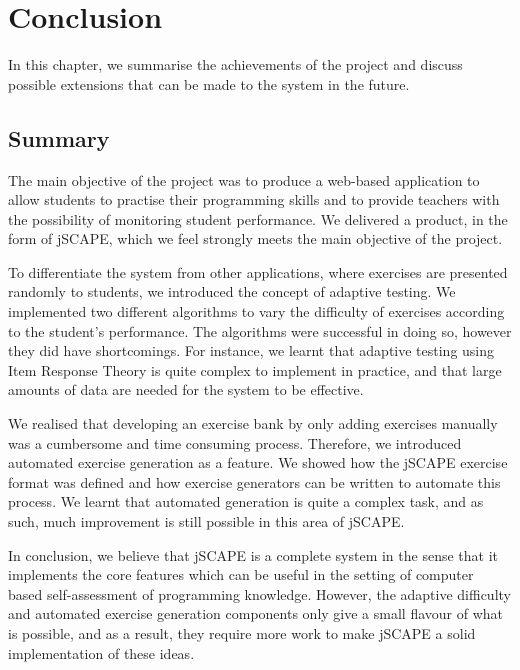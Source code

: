 \chapter{Conclusion}
\label{chap:conclusion}
In this chapter, we summarise the achievements of the project and discuss possible extensions that can be made to the system in the future.

\section{Summary}
The main objective of the project was to produce a web-based application to allow students to practise their programming skills and to provide teachers with the possibility of monitoring student performance. We delivered a product, in the form of jSCAPE, which we feel strongly meets the main objective of the project.\newline

To differentiate the system from other applications, where exercises are presented randomly to students, we introduced the concept of adaptive testing. We implemented two different algorithms to vary the difficulty of exercises according to the student's performance. The algorithms were successful in doing so, however they did have shortcomings. For instance, we learnt that adaptive testing using Item Response Theory is quite complex to implement in practice, and that large amounts of data are needed for the system to be effective. \newline

We realised that developing an exercise bank by only adding exercises manually was a cumbersome and time consuming process. Therefore, we introduced automated exercise generation as a feature. We showed how the jSCAPE exercise format was defined and how exercise generators can be written to automate this process. We learnt that automated generation is quite a complex task, and as such, much improvement is still possible in this area of jSCAPE.\newline

In conclusion, we believe that jSCAPE is a complete system in the sense that it implements the core features which can be useful in the setting of computer based self-assessment of programming knowledge. However, the adaptive difficulty and automated exercise generation components only give a small flavour of what is possible, and as a result, they require more work to make jSCAPE a solid implementation of these ideas.

